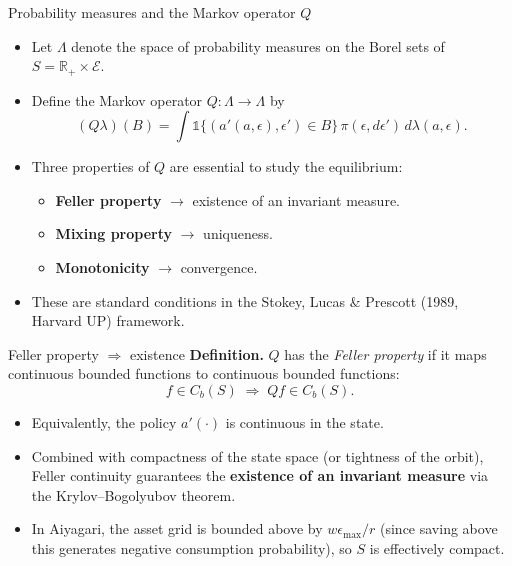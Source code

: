 \begin{frame}{Probability measures and the Markov operator $Q$}
\begin{itemize}
\item Let $\Lambda$ denote the space of probability measures on the Borel sets of $S = \mathbb{R}_+ \times \mathcal{E}$.
\medskip
\item Define the Markov operator $Q : \Lambda \to \Lambda$ by
\[
(Q\lambda)(B) = \int \mathbb{1}\{(a'(a,\epsilon),\epsilon') \in B\}\,\pi(\epsilon,d\epsilon')\,d\lambda(a,\epsilon).
\]
\medskip
\item Three properties of $Q$ are essential to study the equilibrium:
  \begin{itemize}
  \item \textbf{Feller property} $\to$ existence of an invariant measure.
  \item \textbf{Mixing property} $\to$ uniqueness.
  \item \textbf{Monotonicity} $\to$ convergence.
  \end{itemize}
\medskip
\item These are standard conditions in the Stokey, Lucas \& Prescott (1989, Harvard UP) framework.
\end{itemize}
\end{frame}

\begin{frame}{Feller property $\Rightarrow$ existence}
\textbf{Definition.} $Q$ has the \emph{Feller property} if it maps continuous bounded functions to continuous bounded functions:
\[
f \in C_b(S) \;\Rightarrow\; Q f \in C_b(S).
\]
\medskip
\begin{itemize}
\item Equivalently, the policy $a'(\cdot)$ is continuous in the state.
\medskip
\item Combined with compactness of the state space (or tightness of the orbit), Feller continuity guarantees the \textbf{existence of an invariant measure} via the Krylov--Bogolyubov theorem.
\medskip
\item In Aiyagari, the asset grid is bounded above by $w \epsilon_{\max}/r$ (since saving above this generates negative consumption probability), so $S$ is effectively compact.
\end{itemize}
\end{frame}

